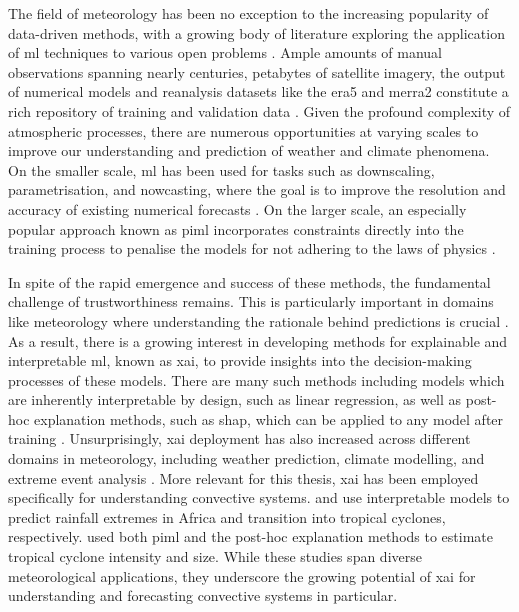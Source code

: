 The field of meteorology has been no exception to the increasing popularity of data-driven methods, with a growing body of literature exploring the application of \acrshort{ml} techniques to various open problems \citep{Bracco2024,Mamalakis2022,Waqas2024}. Ample amounts of manual observations spanning nearly centuries, petabytes of satellite imagery, the output of numerical models and reanalysis datasets like the \acrfull{era5} and \acrfull{merra2} constitute a rich repository of training and validation data \citep{Bracco2024,Waqas2024,Zhang2025}. Given the profound complexity of atmospheric processes, there are numerous opportunities at varying scales to improve our understanding and prediction of weather and climate phenomena. On the smaller scale, \acrshort{ml} has been used for tasks such as downscaling, parametrisation, and nowcasting, where the goal is to improve the resolution and accuracy of existing numerical forecasts \citep{Blunn2024,Zhang2023}. On the larger scale, an especially popular approach known as \acrfull{piml} incorporates constraints directly into the training process to penalise the models for not adhering to the laws of physics \citep{Pathak2022,Luo2025,Zhang2023}.

In spite of the rapid emergence and success of these methods, the fundamental challenge of trustworthiness remains. This is particularly important in domains like meteorology where understanding the rationale behind predictions is crucial \citep{BarredoArrieta2019,Zhang2025}. As a result, there is a growing interest in developing methods for explainable and interpretable \acrshort{ml}, known as \acrfull{xai}, to provide insights into the decision-making processes of these models. There are many such methods including models which are inherently interpretable by design, such as linear regression, as well as post-hoc explanation methods, such as \acrfull{shap}, which can be applied to any model after training \citep{BarredoArrieta2019,Molnar2025}. Unsurprisingly, \acrshort{xai} deployment has also increased across different domains in meteorology, including weather prediction, climate modelling, and extreme event analysis \citep{Mamalakis2022,Yang2024}. More relevant for this thesis, \acrshort{xai} has been employed specifically for understanding convective systems. \cite{Bassine2025} and \cite{Zhang2019} use interpretable models to predict rainfall extremes in Africa and  transition into tropical cyclones, respectively. \cite{Zhuo2021} used both \acrshort{piml} and the post-hoc explanation methods to estimate tropical cyclone intensity and size. While these studies span diverse meteorological applications, they underscore the growing potential of \acrshort{xai} for understanding and forecasting convective systems in particular.

